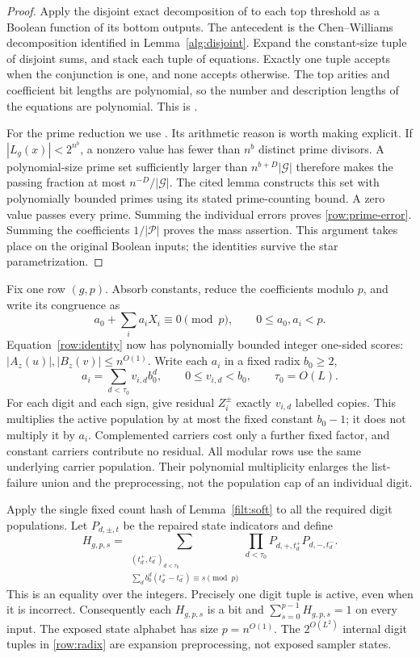 \documentclass[11pt,letterpaper]{article}
\theoremstyle{definition}
\theoremstyle{remark}
\begin{document}
\begin{proof}
Apply the disjoint exact decomposition of
\cite[Lemma~A.4]{NagCubic} to each top threshold as a Boolean function
of its bottom outputs.  The antecedent is the Chen--Williams
decomposition identified in Lemma~\ref{alg:disjoint}.  Expand the
constant-size tuple of disjoint sums, and stack each tuple of equations.
Exactly one tuple accepts when the conjunction is one, and none accepts
otherwise.  The top arities and coefficient bit lengths are polynomial,
so the number and description lengths of the equations are polynomial.
This is \cite[Proposition~A.6]{NagCubic}.

For the prime reduction we use \cite[Lemma~A.7]{NagCubic}.  Its
arithmetic reason is worth making explicit.  If $|L_g(x)|<2^{n^b}$,
a nonzero value has fewer than $n^b$ distinct prime divisors.  A
polynomial-size prime set sufficiently larger than
$n^{b+D}|\mathcal G|$ therefore makes the passing fraction at most
$n^{-D}/|\mathcal G|$.  The cited lemma constructs this set with
polynomially bounded primes using its stated prime-counting bound.
A zero value passes every prime.  Summing the individual errors proves
\eqref{row:prime-error}.  Summing the coefficients $1/|\mathcal P|$
proves the mass assertion.  This argument takes place on the original
Boolean inputs; the identities survive the star parametrization.
\end{proof}

Fix one row $(g,p)$.  Absorb constants, reduce the coefficients modulo
$p$, and write its congruence as
\[
 a_0+\sum_i a_iX_i\equiv0\pmod p,
 \qquad 0\le a_0,a_i<p.
\]
Equation~\eqref{row:identity} now has polynomially bounded integer
one-sided scores: $|A_z(u)|,|B_z(v)|\le n^{O(1)}$.  Write each $a_i$
in a fixed radix $b_0\ge2$,
\[
 a_i=\sum_{d<\tau_0}v_{i,d}b_0^d,
 \qquad 0\le v_{i,d}<b_0,
 \qquad \tau_0=O(L).
\]
For each digit and each sign, give residual $Z_i^\pm$ exactly
$v_{i,d}$ labelled copies.  This multiplies the active population by
at most the fixed constant $b_0-1$; it does not multiply it by $a_i$.
Complemented carriers cost only a further fixed factor, and constant
carriers contribute no residual.  All modular rows use the same
underlying carrier population.  Their polynomial multiplicity enlarges
the list-failure union and the preprocessing, not the population cap of
an individual digit.

Apply the single fixed count hash of Lemma~\ref{filt:soft} to all the
required digit populations.  Let $P_{d,\pm,t}$ be the repaired state
indicators and define
\begin{equation}
 H_{g,p,s}=
 \sum_{\substack{(t_d^+,t_d^-)_{d<\tau_0}\\
       \sum_d b_0^d(t_d^+-t_d^-)\equiv s\pmod p}}
       \prod_{d<\tau_0}P_{d,+,t_d^+}P_{d,-,t_d^-}.
 \label{row:radix}
\end{equation}
This is an equality over the integers.  Precisely one digit tuple is
active, even when it is incorrect.  Consequently each $H_{g,p,s}$ is a
bit and $\sum_{s=0}^{p-1}H_{g,p,s}=1$ on every input.  The exposed
state alphabet has size $p=n^{O(1)}$.  The
$2^{O(L^2)}$ internal digit tuples in \eqref{row:radix} are expansion
preprocessing, not exposed sampler states.
\end{document}
